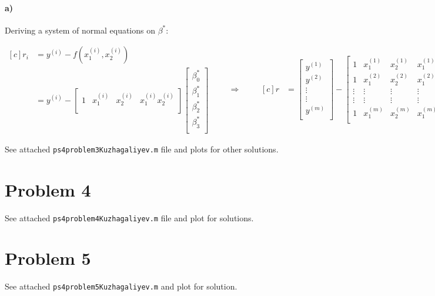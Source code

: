\documentclass[10pt,letter]{article}
\begin{document}
\paragraph{a)} Deriving a system of normal equations on $\beta^*$:

\begin{equation*}
\begin{aligned}[c]
r_i &= y^{(i)} - f(x_1^{(i)}, x_2^{(i)})
\\ &= y^{(i)} - 
\left[ {\begin{array}{cccc}
 1 & x_1^{(i)} & x_2^{(i)} & x_1^{(i)} x_2^{(i)} \\
\end{array} } \right]
\left[ {\begin{array}{c}
\beta^*_0 \\
\beta^*_1 \\
\beta^*_2 \\
\beta^*_3 \\
\end{array} } \right]
\end{aligned}
\qquad\Rightarrow\qquad
\begin{aligned}[c]
r &=  
\left[ {\begin{array}{c}
y^{(1)} \\
y^{(2)} \\
\vdots \\
\vdots \\
y^{(m)} \\
\end{array} } \right]
-
\left[ {\begin{array}{cccc}
 1 & x_1^{(1)} & x_2^{(1)} & x_1^{(1)} x_2^{(1)} \\
 1 & x_1^{(2)} & x_2^{(2)} & x_1^{(2)} x_2^{(2)} \\
 \vdots & \vdots & \vdots & \vdots \\
 \vdots & \vdots & \vdots & \vdots \\
 1 & x_1^{(m)} & x_2^{(m)} & x_1^{(m)} x_2^{(m)} \\
\end{array} } \right]
\left[ {\begin{array}{c}
\beta^*_0 \\
\beta^*_1 \\
\beta^*_2 \\
\beta^*_3 \\
\end{array} } \right]
\end{aligned}
\end{equation*}

See attached \texttt{ps4problem3Kuzhagaliyev.m} file and plots for other solutions.

\section*{Problem 4}

See attached \texttt{ps4problem4Kuzhagaliyev.m} file and plot for solutions.

\section*{Problem 5}

See attached \texttt{ps4problem5Kuzhagaliyev.m} and plot for solution.
\end{document}
